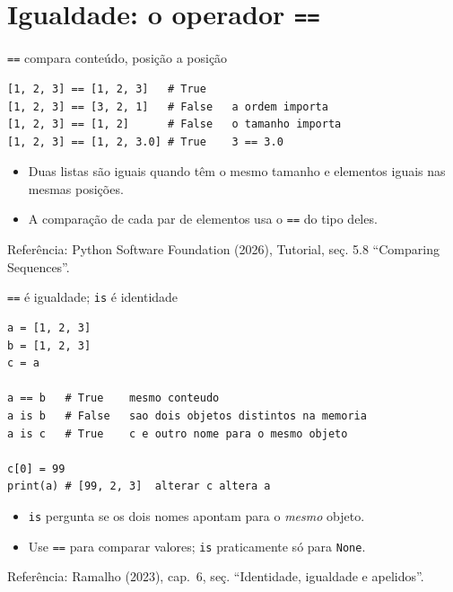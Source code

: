 \documentclass[aspectratio=169]{beamer}
\newcommand{\fonte}[1]{\vfill{\scriptsize\color{UFSGray}Refer\^encia: #1}}
\begin{document}
\section{Igualdade: o operador \texttt{==}}

\begin{frame}[fragile]{\texttt{==} compara conteúdo, posição a posição}
\begin{lstlisting}
[1, 2, 3] == [1, 2, 3]   # True
[1, 2, 3] == [3, 2, 1]   # False   a ordem importa
[1, 2, 3] == [1, 2]      # False   o tamanho importa
[1, 2, 3] == [1, 2, 3.0] # True    3 == 3.0
\end{lstlisting}

\begin{itemize}
  \item Duas listas são iguais quando têm o mesmo tamanho e elementos iguais nas mesmas posições.
  \item A comparação de cada par de elementos usa o \texttt{==} do tipo deles.
\end{itemize}

\fonte{Python Software Foundation (2026), Tutorial, se\c{c}. 5.8 ``Comparing Sequences''.}
\end{frame}

\begin{frame}[fragile]{\texttt{==} é igualdade; \texttt{is} é identidade}
\begin{lstlisting}
a = [1, 2, 3]
b = [1, 2, 3]
c = a

a == b   # True    mesmo conteudo
a is b   # False   sao dois objetos distintos na memoria
a is c   # True    c e outro nome para o mesmo objeto

c[0] = 99
print(a) # [99, 2, 3]  alterar c altera a
\end{lstlisting}

\begin{itemize}
  \item \texttt{is} pergunta se os dois nomes apontam para o \emph{mesmo} objeto.
  \item Use \texttt{==} para comparar valores; \texttt{is} praticamente só para \texttt{None}.
\end{itemize}

\fonte{Ramalho (2023), cap.\ 6, se\c{c}. ``Identidade, igualdade e apelidos''.}
\end{frame}
\end{document}
